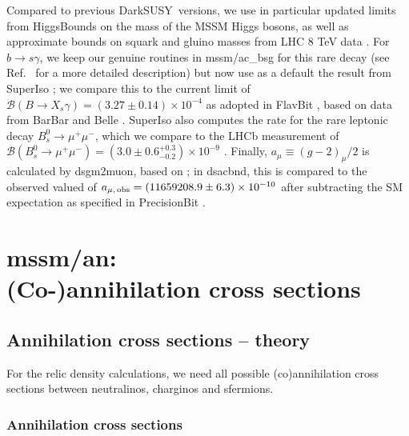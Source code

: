 \documentclass[a4paper,10pt,oneside]{book}
\newcommand{\code}[1]{\ft{#1}}
\newcommand{\codeb}[1]{\ftb{#1}}
\newcommand{\ds}{{\sffamily DarkSUSY}}
\newcommand{\ft}[1]{\textsf{#1}}
\newcommand{\ftb}[1]{{\bfseries \sffamily #1}}
\begin{document}
Compared to previous \ds\ versions, we use in particular updated limits from 
{\sf HiggsBounds} \cite{Bechtle:2008jh} on the mass of the MSSM Higgs bosons, as well as
approximate bounds on squark and gluino masses from LHC 8 TeV data \cite{Aad:2014wea}.
For $b \rightarrow s \gamma$, we keep our genuine routines in \code{mssm/ac\_bsg} 
for this rare decay (see Ref.~\cite{ds4} for
a more detailed description) but now use as a default the result from {\sf SuperIso} \cite{Mahmoudi:2007vz};
we compare this to the current limit of $\mathcal{B}(B \to X_s\gamma) = (3.27 \pm 0.14) \times 10^{-4}$ 
as adopted in {\sf FlavBit} \cite{Workgroup:2017myk}, based on data from BarBar and Belle 
\cite{Lees:2012wg,Lees:2012ym,Belle:2016ufb}. {\sf SuperIso} also computes the rate for the
rare leptonic decay  $B_s^0\to\mu^+\mu^-$, which we compare to the LHCb measurement of 
$\mathcal{B}(B_s^0 \to \mu^+\mu^-) = (3.0 \pm 0.6^{+0.3}_{-0.2}) \times 10^{-9}$  \cite{Aaij:2017vad}.
Finally, $a_\mu\equiv (g-2)_\mu/2$ is calculated by \code{dsgm2muon}, based on \cite{Moroi:1995yh};
in  \code{dsacbnd}, this is compared to the observed
valued of $a_{\mu,\,{\rm obs}} = (11659208.9 \pm 6.3) \times 10^{-10}$ \cite{Bennett:2006fi} 
after subtracting the SM expectation as specified in {\sf PrecisionBit} \cite{Workgroup:2017bkh}.

\section[mssm/an: (Co-)annihilation cross sections]{\codeb{mssm/an}:\\ (Co-)annihilation cross sections}
\label{sec:src_models/mssm/an}


\subsection{Annihilation cross sections -- theory }

For the relic density calculations, we need all possible
(co)annihilation cross sections between neutralinos, charginos and
sfermions.


\subsubsection{Annihilation cross sections}
\label{sec:AnnCross}
\end{document}
